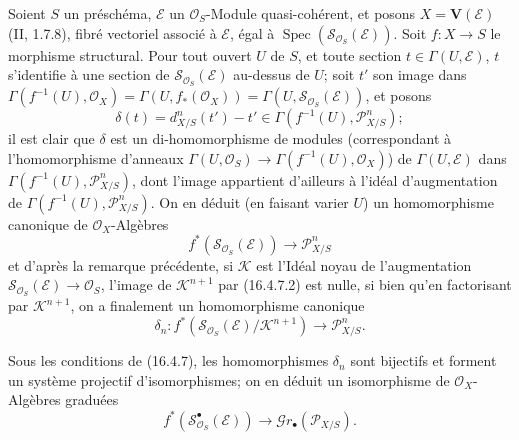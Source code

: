 \begin{env}[16.4.7]
\label{IV.16.4.7}
Soient $S$ un préschéma, $\mathscr{E}$ un $\mathcal{O}_S$-Module
quasi-cohérent, et posons $X=\mathbf{V}(\mathscr{E})$ (II, 1.7.8), fibré
vectoriel associé à $\mathscr{E}$, égal à
$\operatorname{Spec}(\mathscr{S}_{\mathcal{O}_S}(\mathscr{E}))$. Soit
$f:X\to S$ le morphisme structural. Pour tout ouvert $U$ de $S$, et toute
section $t\in\Gamma(U,\mathscr{E})$, $t$ s'identifie à une section de
$\mathscr{S}_{\mathcal{O}_S}(\mathscr{E})$ au-dessus de $U$; soit $t'$ son
image dans
$\Gamma(f^{-1}(U),\mathcal{O}_X)=\Gamma(U,f_*(\mathcal{O}_X))=
\Gamma(U,\mathscr{S}_{\mathcal{O}_S}(\mathscr{E}))$, et posons
\[
  \delta(t)=d_{X/S}^n(t')-t'\in
  \Gamma(f^{-1}(U),\mathscr{P}_{X/S}^n);
  \tag{16.4.7.1}
  \label{IV.16.4.7.1}
\]
il est clair que $\delta$ est un di-homomorphisme de modules (correspondant à
l'homomorphisme d'anneaux
$\Gamma(U,\mathcal{O}_S)\to\Gamma(f^{-1}(U),\mathcal{O}_X)$) de
$\Gamma(U,\mathscr{E})$ dans $\Gamma(f^{-1}(U),\mathscr{P}_{X/S}^n)$, dont
l'image appartient d'ailleurs à l'idéal d'augmentation de
$\Gamma(f^{-1}(U),\mathscr{P}_{X/S}^n)$. On en déduit (en faisant varier $U$)
un homomorphisme canonique de $\mathcal{O}_X$-Algèbres
\[
  f^*(\mathscr{S}_{\mathcal{O}_S}(\mathscr{E}))
  \longrightarrow\mathscr{P}_{X/S}^n
  \tag{16.4.7.2}
  \label{IV.16.4.7.2}
\]
et d'après la remarque précédente, si $\mathscr{K}$ est l'Idéal noyau de
l'augmentation $\mathscr{S}_{\mathcal{O}_S}(\mathscr{E})\to\mathcal{O}_S$,
l'image de $\mathscr{K}^{n+1}$ par (16.4.7.2) est nulle, si bien qu'en
factorisant par $\mathscr{K}^{n+1}$, on a finalement un homomorphisme canonique
\[
  \delta_n:f^*(\mathscr{S}_{\mathcal{O}_S}(\mathscr{E})/
  \mathscr{K}^{n+1})\longrightarrow\mathscr{P}_{X/S}^n.
  \tag{16.4.7.3}
  \label{IV.16.4.7.3}
\]
\end{env}

\begin{proposition}[16.4.8]
\label{IV.16.4.8}
Sous les conditions de (16.4.7), les homomorphismes $\delta_n$ sont bijectifs et
forment un système projectif d'isomorphismes; on en déduit un isomorphisme de
$\mathcal{O}_X$-Algèbres graduées
\[
  f^*(\mathscr{S}_{\mathcal{O}_S}^{\bullet}(\mathscr{E}))
  \longrightarrow\mathscr{G}r_\bullet(\mathscr{P}_{X/S}).
  \tag{16.4.8.1}
  \label{IV.16.4.8.1}
\]
\end{proposition}

